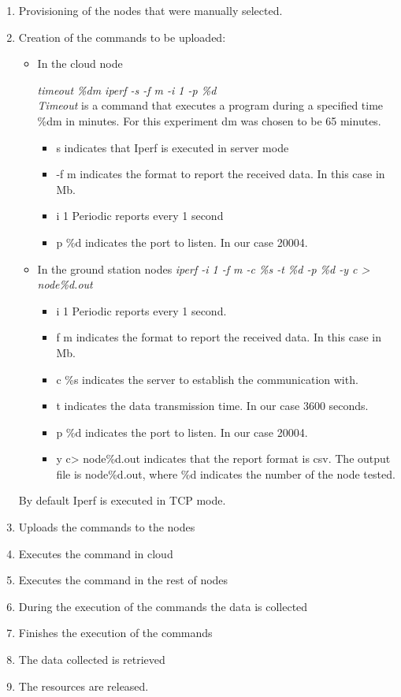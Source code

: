 \begin{enumerate}
\item Provisioning of the nodes that were manually selected.
\item Creation of the commands to be uploaded:
\begin{itemize}
\item In the cloud node

\emph{timeout \%dm iperf -s -f m -i 1 -p \%d} \\
\emph{Timeout} is a command that executes a program during a specified time \%dm in
minutes. For this experiment dm was chosen to be 65 minutes.
\begin{itemize}
\item s indicates that Iperf is executed in server mode
\item -f m indicates the format to report the received data. In this case in Mb.  
\item i 1 Periodic reports every 1 second
\item p \%d indicates the port to listen. In our case 20004.
\end{itemize}

\item In the ground station nodes
\emph{iperf  -i 1 -f m -c \%s -t \%d -p \%d  -y c > node\%d.out}\\
\begin{itemize}
\item i 1 Periodic reports every 1 second.
\item f m indicates the format to report the received data. In this case in Mb.
\item c \%s indicates the server to establish the communication with.
\item t indicates the data transmission time. In our case 3600 seconds.
\item p \%d indicates the port to listen. In our case 20004.
\item y c> node\%d.out indicates that the report format is csv. The output file
  is node\%d.out, where \%d indicates the number of the node tested.
\end{itemize}
\end{itemize}

By default Iperf is executed in TCP mode.

\item Uploads the commands to the nodes
\item Executes the command in cloud
\item Executes the command in the rest of nodes
\item During the execution of the commands the data is collected
\item Finishes the execution of the commands 
\item The data collected is retrieved 
\item The resources are released.
\end{enumerate}

